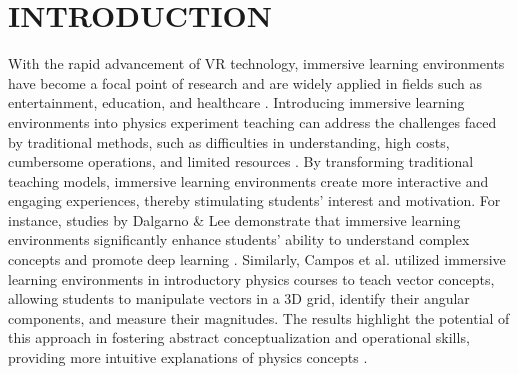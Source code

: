 \documentclass[runningheads]{llncs}
\begin{document}
\section{INTRODUCTION}
With the rapid advancement of VR technology, immersive learning environments have become a focal point of research and are widely applied in fields such as entertainment, education, and healthcare \cite{luo2020dream,yeung2021virtual}. Introducing immersive learning environments into physics experiment teaching can address the challenges faced by traditional methods, such as difficulties in understanding, high costs, cumbersome operations, and limited resources \cite{yang2007impact,abu2018design}. By transforming traditional teaching models, immersive learning environments create more interactive and engaging experiences, thereby stimulating students' interest and motivation. For instance, studies by Dalgarno \& Lee demonstrate that immersive learning environments significantly enhance students' ability to understand complex concepts and promote deep learning \cite{dalgarno2010learning}. Similarly, Campos et al. utilized immersive learning environments in introductory physics courses to teach vector concepts, allowing students to manipulate vectors in a 3D grid, identify their angular components, and measure their magnitudes. The results highlight the potential of this approach in fostering abstract conceptualization and operational skills, providing more intuitive explanations of physics concepts \cite{campos2022impact}.
\end{document}

